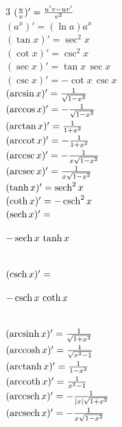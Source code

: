 \def\sinh{\mathop{\rm sinh}\nolimits}
\def\cosh{\mathop{\rm cosh}\nolimits}
\def\sech{\mathop{\rm sech}\nolimits}
\def\csch{\mathop{\rm csch}\nolimits}
\def\coth{\mathop{\rm coth}\nolimits}
\def\tanh{\mathop{\rm tanh}\nolimits}

\def\arccot{\mathop{\rm arccot}\nolimits}
\def\arcsec{\mathop{\rm arcsec}\nolimits}
\def\arccsc{\mathop{\rm arccsc}\nolimits}
\def\arcsinh{\mathop{\rm arcsinh}\nolimits}
\def\arccosh{\mathop{\rm arccosh}\nolimits}
\def\arctanh{\mathop{\rm arctanh}\nolimits}
\def\arccoth{\mathop{\rm arccoth}\nolimits}
\def\arcsech{\mathop{\rm arcsech}\nolimits}
\def\arccsch{\mathop{\rm arccsch}\nolimits}

\begin{multicols}{3}
	$ ({u \over v})' = {u'v - uv' \over v^2 } $ \\
	$ (a^x)' = (\ln a) a^x $ \\
	$ (\tan x)' = \sec^2 x $ \\
	$ (\cot x)' = \csc^2 x $ \\
	$ (\sec x)' = \tan x\, \sec x $ \\
	$ (\csc x)' = - \cot x\, \csc x $ \\
	$ (\arcsin x)' = {1 \over \sqrt{1-x^2}} $ \\
	$ (\arccos x)' = -{1 \over \sqrt{1-x^2}} $ \\
	$ (\arctan x)' = {1 \over 1+x^2} $ \\
	$ (\arccot x)' = -{1 \over 1+x^2} $ \\
	$ (\arccsc x)' = -{1 \over x \sqrt{1-x^2}} $ \\
	$ (\arcsec x)' = {1 \over x \sqrt{1-x^2}} $ \\
	$ (\tanh x)' = \sech^2 x $ \\
	$ (\coth x)' = -\csch^2 x $ \\
	$ (\sech x)' =$ \begin{tiny}$-\sech x \, \tanh x$\end{tiny} \\
	$ (\csch x)' =$ \begin{tiny}$-\csch x \, \coth x$\end{tiny} \\
	$ (\arcsinh x)' = {1 \over \sqrt{1+x^2}} $ \\
	$ (\arccosh x)' = {1 \over \sqrt{x^2-1}} $ \\
	$ (\arctanh x)' = {1 \over 1-x^2} $ \\
	$ (\arccoth x)' = {1 \over x^2-1} $ \\
	$ (\arccsch x)' = -{1 \over \vert x \vert \sqrt{1+x^2}} $ \\
	$ (\arcsech x)' = -{1 \over x \sqrt{1-x^2}} $ \\
\end{multicols}


